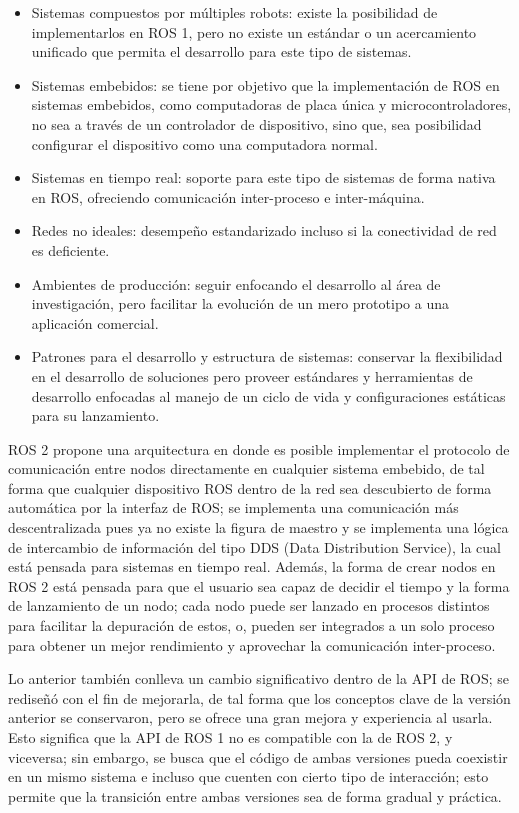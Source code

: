 \begin{itemize}
    \item Sistemas compuestos por múltiples robots: existe la posibilidad de implementarlos en ROS 1, pero no existe un estándar o un acercamiento unificado que permita el desarrollo para este tipo de sistemas.
    \item Sistemas embebidos: se tiene por objetivo que la implementación de ROS en sistemas embebidos, como computadoras de placa única y microcontroladores, no sea a través de un controlador de dispositivo, sino que, sea posibilidad configurar el dispositivo como una computadora normal.
    \item Sistemas en tiempo real: soporte para este tipo de sistemas de forma nativa en ROS, ofreciendo comunicación inter-proceso e inter-máquina.
    \item Redes no ideales: desempeño estandarizado incluso si la conectividad de red es deficiente.
    \item Ambientes de producción: seguir enfocando el desarrollo al área de investigación, pero facilitar la evolución de un mero prototipo a una aplicación comercial.
    \item Patrones para el desarrollo y estructura de sistemas: conservar la flexibilidad en el desarrollo de soluciones pero proveer estándares y herramientas de desarrollo enfocadas al manejo de un ciclo de vida y configuraciones estáticas para su lanzamiento.
\end{itemize}

ROS 2 propone una arquitectura en donde es posible implementar el protocolo de comunicación entre nodos directamente en cualquier sistema embebido, de tal forma que cualquier dispositivo ROS dentro de la red sea descubierto de forma automática por la interfaz de ROS; se implementa una comunicación más descentralizada pues ya no existe la figura de maestro y se implementa una lógica de intercambio de información del tipo DDS (Data Distribution Service), la cual está pensada para sistemas en tiempo real. Además, la forma de crear nodos en ROS 2 está pensada para que el usuario sea capaz de decidir el tiempo  y la forma de lanzamiento de un nodo; cada nodo puede ser lanzado en procesos distintos para facilitar la depuración de estos, o, pueden ser integrados a un solo proceso para obtener un mejor rendimiento y aprovechar la comunicación inter-proceso.  

Lo anterior también conlleva un cambio significativo dentro de la API de ROS; se rediseñó con el fin de mejorarla, de tal forma que los conceptos clave de la versión anterior se conservaron, pero se ofrece una gran mejora y experiencia al usarla. Esto significa que la API de ROS 1 no es compatible con la de ROS 2, y viceversa; sin embargo, se busca que el código de ambas versiones pueda coexistir en un mismo sistema e incluso que cuenten con cierto tipo de interacción; esto permite que la transición entre ambas versiones sea de forma gradual y práctica.

